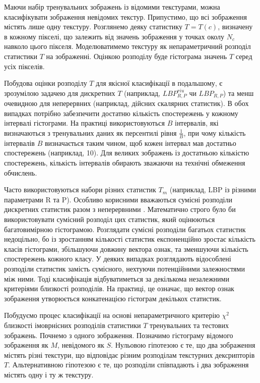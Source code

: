 Маючи набір тренувальних зображень із відомими текстурами, можна класифікувати зображення невідомих текстур.
Припустимо, що всі зображення містять лише одну текстуру.
Розглянемо деяку статистику $T = T(c)$, визначену в кожному пікселі, що залежить від значень зображення у точках околу $N_c$ навколо цього пікселя.
Моделюватимемо текстуру як непараметричний розподіл статистики $T$ на зображенні.
Оцінкою розподілу буде гістограма значень $T$ серед усіх пікселів.

Побудова оцінки розподілу $T$ для якісної класифікації в подальшому, є зрозумілою задачею для дискретних $T$ (наприклад, $LBP^{riu}_{R,P}$ чи $LBP_{R,P}$) та менш очевидною для неперервних (наприклад, дійсних скалярних статистик).
В обох випадках потрібно забезпечити достатню кількість спостережень у кожному інтервалі гістограми.
На практиці використовуються $B$ інтервалів, які визначаються з тренувальних даних як персентилі рівня $\frac{1}{B}$, 
при чому кількість інтервалів $B$ визначається таким чином, щоб кожен інтервал мав достатньо спостережень (наприклад, 10). 
Для великих зображень із достатньою кількістю спостережень, кількість інтервалів обирають зважаючи на технічні обмеження обчислень.

Часто використовуються набори різних статистик $T_m$ (наприклад, LBP із різними параметрами R та P).
Особливо корисними вважаються сумісні розподіли дискретних статистик разом з неперервними \cite{guo2010lbpv}.
Математично строго було би використовувати сумісний розподіл цих статистик, який оцінюються багатовимірною гістограмою.
Розглядати сумісні розподіли багатьох статистик недоцільно, бо із зростанням кількості статистик експоненційно зростає кількість класів гістограми, 
збільшуючи довжину вектора ознак, та зменшуючи кількість спостережень кожного класу. 
У деяких випадках розглядають відособлені розподіли статистик замість сумісного, нехтуючи потенційними залежностями між ними.
Тоді класифікація відбуватиметься за декількома незалежними критеріями близкості розподілів. 
На практиці, це означає, що вектор ознак зображення утворюється конкатенацією гістограм декількох статистик.

Побудуємо процес класифікації на основі непараметричного критерію $\chi^2$ близкості імоврнісних розподілів статистики $T$ тренувальних та тестових зображень.
Почнемо з одного зображення. Позначимо гістограму відомого зображення як $M$, невідомого як $S$. 
Нульовою гіпотезою є те, що два зображення містять різні текстури, що відповідає різним розподілам текстурних дексрипторів $T$.
Альтернативною гіпотезою є те, що розподіли співпадають і два зображення містять одну і ту ж текстуру.

